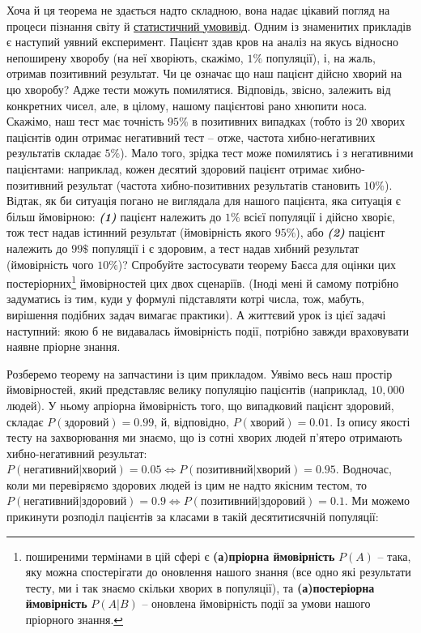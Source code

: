 \documentclass[
  11pt,
]{book}
\begin{document}
Хоча й ця теорема не здається надто складною, вона надає цікавий погляд на процеси пізнання світу й \hyperref[paradigms]{статистичний умовивід}. Одним із знаменитих прикладів є наступий уявний експеримент. Пацієнт здав кров на аналіз на якусь відносно непоширену хворобу (на неї хворіють, скажімо, \(1\%\) популяції), і, на жаль, отримав позитивний результат. Чи це означає що наш пацієнт дійсно хворий на цю хворобу? Адже тести можуть помилятися. Відповідь, звісно, залежить від конкретних чисел, але, в цілому, нашому пацієнтові рано хнюпити носа. Скажімо, наш тест має точність \(95\%\) в позитивних випадках (тобто із \(20\) хворих пацієнтів один отримає негативний тест -- отже, частота хибно-негативних результатів складає \(5\%\)). Мало того, зрідка тест може помилятись і з негативними пацієнтами: наприклад, кожен десятий здоровий пацієнт отримає хибно-позитивний результат (частота хибно-позитивних результатів становить \(10\%\)). Відтак, як би ситуація погано не виглядала для нашого пацієнта, яка ситуація є більш ймовірною: \textbf{\emph{(1)}} пацієнт належить до \(1\%\) всієї популяції і дійсно хворіє, тож тест надав істинний результат (ймовірність якого \(95\%\)), або \textbf{\emph{(2)}} пацієнт належить до \(99\$%
\) популяції і є здоровим, а тест надав хибний результат (ймовірність чого \(10\%\))? Спробуйте застосувати теорему Баєса для оцінки цих постеріорних\footnote{поширеними термінами в цій сфері є \textbf{(а)пріорна ймовірність} \(P(A)\) -- така, яку можна спостерігати до оновлення нашого знання (все одно які результати тесту, ми і так знаємо скільки хворих в популяції), та \textbf{(а)постеріорна ймовірність} \(P(A|B)\) -- оновлена ймовірність події за умови нашого пріорного знання.} ймовірностей цих двох сценаріїв. (Іноді мені й самому потрібно задуматись із тим, куди у формулі підставляти котрі числа, тож, мабуть, вирішення подібних задач вимагає практики). А життєвий урок із цієї задачі наступний: якою б не видавалась ймовірність події, потрібно завжди враховувати наявне пріорне знання.

Розберемо теорему на запчастини із цим прикладом. Уявімо весь наш простір ймовірностей, який представляє велику популяцію пацієнтів (наприклад, \(10,000\) людей). У ньому апріорна ймовірність того, що випадковий пацієнт здоровий, складає \(P(\text{здоровий}) = 0.99\), й, відповідно, \(P(\text{хворий}) = 0.01\). Із опису якості тесту на захворювання ми знаємо, що із сотні хворих людей п'ятеро отримають хибно-негативний результат: \(P(\text{негативний|хворий}) = 0.05 \Leftrightarrow P(\text{позитивний|хворий}) = 0.95\). Водночас, коли ми перевіряємо здорових людей із цим не надто якісним тестом, то \(P(\text{негативний|здоровий}) = 0.9 \Leftrightarrow P(\text{позитивний|здоровий}) = 0.1\). Ми можемо прикинути розподіл пацієнтів за класами в такій десятитисячній популяції:
\end{document}
